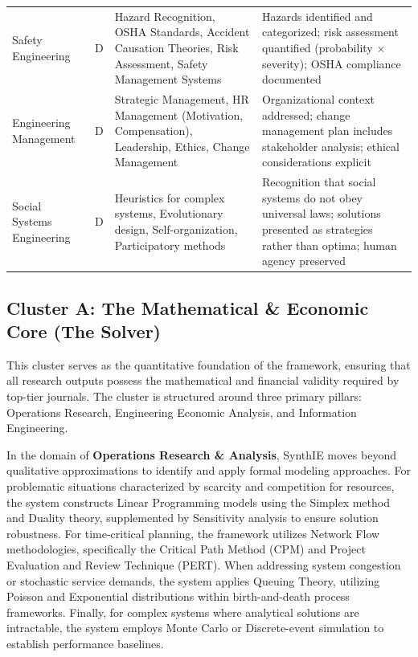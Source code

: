 \documentclass[12pt,a4paper]{article}
\begin{document}
\begin{table}[h]
\begin{tabular}{@{}p{3.5cm}cp{4cm}p{5cm}@{}}
Safety Engineering & D & Hazard Recognition, OSHA Standards, Accident Causation Theories, Risk Assessment, Safety Management Systems & Hazards identified and categorized; risk assessment quantified (probability $\times$ severity); OSHA compliance documented \\
\addlinespace

Engineering Management & D & Strategic Management, HR Management (Motivation, Compensation), Leadership, Ethics, Change Management & Organizational context addressed; change management plan includes stakeholder analysis; ethical considerations explicit \\
\addlinespace

Social Systems Engineering & D & Heuristics for complex systems, Evolutionary design, Self-organization, Participatory methods & Recognition that social systems do not obey universal laws; solutions presented as strategies rather than optima; human agency preserved \\

\bottomrule
\end{tabular}
\end{table}

\subsection{Cluster A: The Mathematical \& Economic Core (The Solver)}

This cluster serves as the quantitative foundation of the framework, ensuring that all research outputs possess the mathematical and financial validity required by top-tier journals. The cluster is structured around three primary pillars: Operations Research, Engineering Economic Analysis, and Information Engineering.

In the domain of \textbf{Operations Research \& Analysis}, SynthIE moves beyond qualitative approximations to identify and apply formal modeling approaches. For problematic situations characterized by scarcity and competition for resources, the system constructs Linear Programming models using the Simplex method and Duality theory, supplemented by Sensitivity analysis to ensure solution robustness. For time-critical planning, the framework utilizes Network Flow methodologies, specifically the Critical Path Method (CPM) and Project Evaluation and Review Technique (PERT). When addressing system congestion or stochastic service demands, the system applies Queuing Theory, utilizing Poisson and Exponential distributions within birth-and-death process frameworks. Finally, for complex systems where analytical solutions are intractable, the system employs Monte Carlo or Discrete-event simulation to establish performance baselines.
\end{document}
